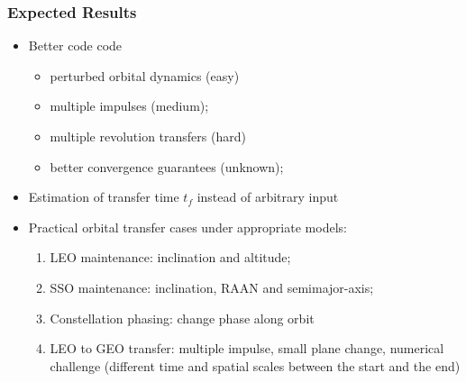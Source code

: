 \documentclass{beamer}
\begin{document}
\begin{frame}
    \frametitle{Expected Results}

    \begin{itemize}\pause
        \item Better code code\pause
        \begin{itemize}
            \item perturbed orbital dynamics (easy)
            \item multiple impulses (medium);
            \item multiple revolution transfers (hard)
            \item better convergence guarantees (unknown);
        \end{itemize}
        \item Estimation of transfer time \(t_f\) instead of arbitrary input~\cite{embedded_lambert}\pause
        \item Practical orbital transfer cases under appropriate models:\pause
        \begin{enumerate}
            \item LEO maintenance: inclination and altitude;
            \item SSO maintenance: inclination, RAAN and semimajor-axis;
            \item Constellation phasing: change phase along orbit
            \item LEO to GEO transfer: multiple impulse, small plane change, numerical challenge (different time and spatial scales between the start and the end)
        \end{enumerate}
    \end{itemize}

\end{frame}
\end{document}

